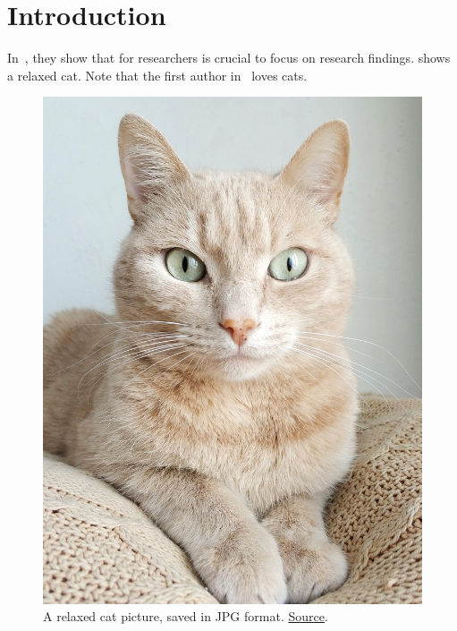 
\section{Introduction \label{sec:introduction}}
	In~\cite{ACleverResearcher2023}, they show that for researchers is crucial to focus on research findings.
	 shows a relaxed cat. 
	Note that the first author in~\cite{ACleverResearcher2023} loves cats.
	
	\begin{figure}[H]
		\centering
		\includegraphics[height=.5\textwidth]{fig/nice-cat.jpg}
		\caption{
			A relaxed cat picture, saved in JPG format. \href{https://www.pexels.com/photo/orange-tabby-cat-on-brown-knitted-textile-982300/}{Source}.
			\label{fig:cool-images}
		}
	\end{figure}
	
